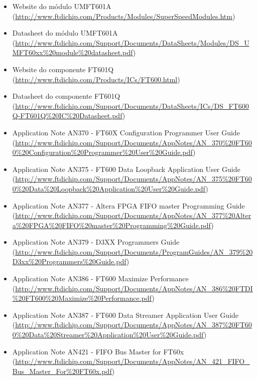   \begin{itemize}
  	\item Website do módulo UMFT601A (\url{http://www.ftdichip.com/Products/Modules/SuperSpeedModules.htm})
  	\item Datasheet do módulo UMFT601A (\url{http://www.ftdichip.com/Support/Documents/DataSheets/Modules/DS_UMFT60xx%20module%20datasheet.pdf})
  	\item Website do componente FT601Q (\url{http://www.ftdichip.com/Products/ICs/FT600.html})
  	\item Datasheet do componente FT601Q (\url{http://www.ftdichip.com/Support/Documents/DataSheets/ICs/DS_FT600Q-FT601Q%20IC%20Datasheet.pdf})
  	\item Application Note AN370 - FT60X Configuration Programmer User Guide (\url{http://www.ftdichip.com/Support/Documents/AppNotes/AN_370%20FT600%20Configuration%20Programmer%20User%20Guide.pdf})
  	\item Application Note AN375 - FT600 Data Loopback Application User Guide (\url{http://www.ftdichip.com/Support/Documents/AppNotes/AN_375%20FT600%20Data%20Loopback%20Application%20User%20Guide.pdf})
  	\item Application Note AN377 - Altera FPGA FIFO master Programming Guide (\url{http://www.ftdichip.com/Support/Documents/AppNotes/AN_377%20Altera%20FPGA%20FIFO%20master%20Programming%20Guide.pdf})
  	\item Application Note AN379 - D3XX Programmers Guide (\url{http://www.ftdichip.com/Support/Documents/ProgramGuides/AN_379%20D3xx%20Programmers%20Guide.pdf})
  	\item Application Note AN386 - FT600 Maximize Performance (\url{http://www.ftdichip.com/Support/Documents/AppNotes/AN_386%20FTDI%20FT600%20Maximize%20Performance.pdf})
  	\item Application Note AN387 - FT600 Data Streamer Application User Guide (\url{http://www.ftdichip.com/Support/Documents/AppNotes/AN_387%20FT600%20Data%20Streamer%20Application%20User%20Guide.pdf})
  	\item Application Note AN421 - FIFO Bus Master for FT60x (\url{http://www.ftdichip.com/Support/Documents/AppNotes/AN_421_FIFO_Bus_Master_For%20FT60x.pdf})
  \end{itemize}




